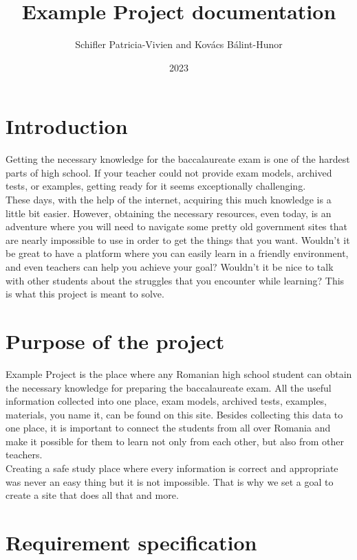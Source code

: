 \documentclass[12pt,a4paper]{article}
\title{Example Project documentation}
\author{Schifler Patricia-Vivien and Kovács Bálint-Hunor}
\date{2023}
\begin{document}


\newpage
\tableofcontents
\newpage
\begin{spacing}{1.5}
    \section{Introduction}\label{sec:intro}
    Getting the necessary knowledge for the baccalaureate exam is one of the
    hardest parts of high school. If your teacher could not provide exam models,
    archived tests, or examples, getting ready for it seems exceptionally
    challenging. \\ \indent These days, with the help of the internet, acquiring
    this much knowledge is a little bit easier. However, obtaining the necessary
    resources, even today, is an adventure where you will need to navigate some
    pretty old government sites that are nearly impossible to use in order to get
    the things that you want. Wouldn't it be great to have a platform where you can
    easily learn in a friendly environment, and even teachers can help you achieve
    your goal? Wouldn't it be nice to talk with other students about the struggles
    that you encounter while learning? This is what this project is meant to solve.

    \section{Purpose of the project}\label{sec:purpose}

    Example Project is the place where any Romanian high school student can obtain
    the necessary knowledge for preparing the baccalaureate exam. All the useful
    information collected into one place, exam models, archived tests, examples,
    materials, you name it, can be found on this site. Besides collecting this data
    to one place, it is important to connect the students from all over Romania and
    make it possible for them to learn not only from each other, but also from
    other teachers. \\ \indent Creating a safe study place where every information
    is correct and appropriate was never an easy thing but it is not impossible.
    That is why we set a goal to create a site that does all that and more.

    \section{Requirement specification}\label{sec:req_spec}

\end{spacing}
\end{document}

